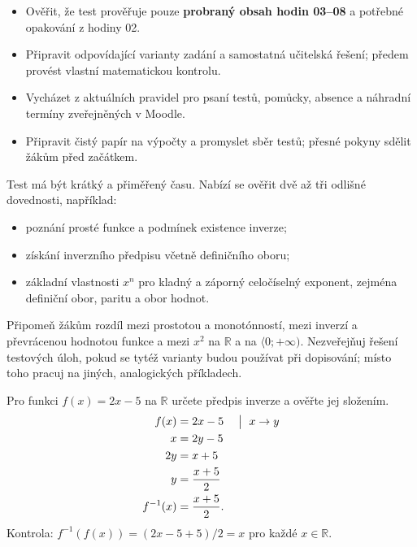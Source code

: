 \documentclass[11pt,a4paper]{article}
\begin{document}

\begin{itemize}[label=$\square$]
\item Ověřit, že test prověřuje pouze \textbf{probraný obsah hodin 03--08} a potřebné opakování z hodiny 02.
\item Připravit odpovídající varianty zadání a samostatná učitelská řešení; předem provést vlastní matematickou kontrolu.
\item Vycházet z aktuálních pravidel pro psaní testů, pomůcky, absence a náhradní termíny zveřejněných v Moodle.
\item Připravit čistý papír na výpočty a promyslet sběr testů; přesné pokyny sdělit žákům před začátkem.
\end{itemize}

Test má být krátký a přiměřený času. Nabízí se ověřit dvě až tři odlišné dovednosti, například:
\begin{itemize}
\item poznání prosté funkce a podmínek existence inverze;
\item získání inverzního předpisu včetně definičního oboru;
\item základní vlastnosti $x^n$ pro kladný a záporný celočíselný exponent, zejména definiční obor, paritu a obor hodnot.
\end{itemize}

Připomeň žákům rozdíl mezi prostotou a monotónností, mezi inverzí a převrácenou hodnotou funkce a mezi $x^2$ na $\mathbb R$ a na $\langle0;+\infty)$. Nezveřejňuj řešení testových úloh, pokud se tytéž varianty budou používat při dopisování; místo toho pracuj na jiných, analogických příkladech.

\begin{prikladReseniBox}[title={Příklad 1}]
Pro funkci $f(x)=2x-5$ na $\mathbb R$ určete předpis inverze a ověřte jej složením.
\tcblower
\[
\begin{aligned}
f(x)&=2x-5 &&\bigm|\ x\to y\\
x&=2y-5\\
2y&=x+5\\
y&=\frac{x+5}{2}\\
f^{-1}(x)&=\frac{x+5}{2}.
\end{aligned}
\]
Kontrola: $f^{-1}(f(x))=(2x-5+5)/2=x$ pro každé $x\in\mathbb R$.
\end{prikladReseniBox}
\end{document}
